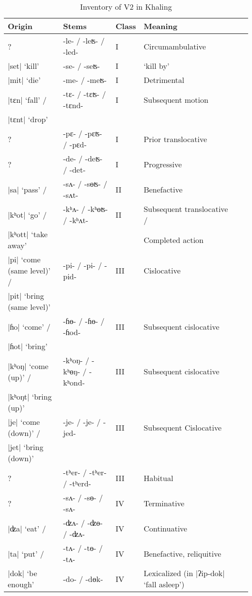 \documentclass[oneside,a4paper,11pt]{article}
\newcommand{\ipa}[1]{{\phon#1}}
\newcommand{\dhatu}[2]{|\ipa{#1}| `#2'}
\begin{document}
\begin{table}[H]
\caption{Inventory of V2 in Khaling} \label{tab:khyal.v2} \centering 
\begin{tabular}{llllll}
\toprule 
Origin & Stems & Class & Meaning \\%
\midrule
?&   \ipa{-le- / -leʦ- / -led-} & I &  Circumambulative   \\
\midrule
\dhatu{set}{kill} &   \ipa{-se- / -seʦ-} & I &  `kill by'   \\
\midrule
\dhatu{mit}{die} &   \ipa{-me- / -meʦ-} & I &  Detrimental   \\
\midrule
\dhatu{tɛn}{fall} / &  \ipa{-tɛ- / -tɛʦ- / -tɛnd-} & I &  Subsequent motion   \\
\dhatu{tɛnt}{drop} &\\
\midrule
 ? &  \ipa{-pɛ- / -pɛʦ- / -pɛd-} & I &  Prior translocative \\
 \midrule
 ?&   \ipa{-de- / -deʦ- / -det-} & I &  Progressive   \\
 \midrule 
\dhatu{sa}{pass} / &  \ipa{-sʌ- / -sɵʦ- / -sʌt-} & II &  Benefactive \\
\midrule
\dhatu{kʰot}{go} / &  \ipa{-kʰʌ- / -kʰɵʦ- / -kʰʌt-} & II &  Subsequent translocative / \\
\dhatu{kʰott}{take away} & &&Completed action & \\
\midrule
\dhatu{pi}{come (same level)} / &  \ipa{-pi- / -pi- / -pid-} & III &  Cislocative \\
\dhatu{pit}{bring (same level)} & &&  & \\
\midrule
\dhatu{ɦo}{come} / &  \ipa{-ɦɵ- / -ɦɵ- / -ɦod-} & III &  Subsequent cislocative \\
\dhatu{ɦot}{bring} & &&  & \\
\midrule
\dhatu{kʰoŋ}{come (up)} / &  \ipa{-kʰoŋ- / -kʰɵŋ- / -kʰond-} & III &  Subsequent cislocative \\
\dhatu{kʰoŋt}{bring (up)} & &&  & \\
\midrule
\dhatu{je}{come (down)} / &  \ipa{-je- / -je- / -jed-} & III &  Subsequent Cislocative \\
\dhatu{jet}{bring (down)} & &&  & \\
\midrule
 ? &  \ipa{-tʰer- / -tʰer- / -tʰerd-} & III &  Habitual   \\
\midrule
 ? &   \ipa{-sʌ- / -sɵ- / -sʌ-} & IV &  Terminative   \\
 \midrule
 \dhatu{ʣa}{eat} / &  \ipa{-ʣʌ- / -ʣɵ- / -ʣʌ-} & IV &  Continuative   \\
 \midrule
  \dhatu{ta}{put} / &  \ipa{-tʌ- / -tɵ- / -tʌ-} & IV &  Benefactive, reliquitive   \\
  \midrule
\dhatu{dok}{be enough} &   \ipa{-do- / -dɵk-} & IV &  Lexicalized (in \dhatu{ʔip-dok}{fall asleep})  \\
\bottomrule 
\end{tabular}
\end{table}
\end{document}
